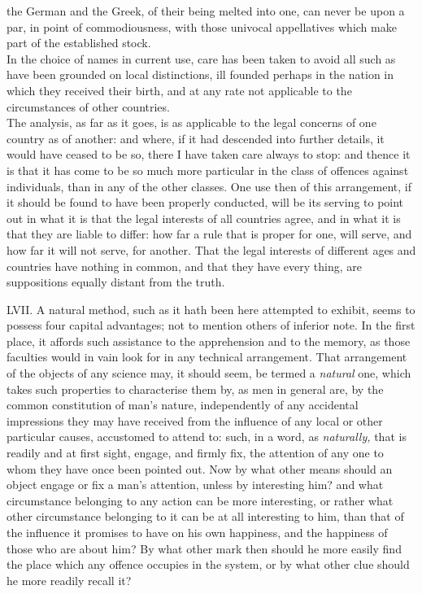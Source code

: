 \documentclass[12pt]{report}
\begin{document}
the German and the Greek, of their being melted into one, can never be
upon a par, in point of commodiousness, with those univocal appellatives
which make part of the established stock.\\
In the choice of names in current use, care has been taken to avoid all
such as have been grounded on local distinctions, ill founded perhaps in
the nation in which they received their birth, and at any rate not
applicable to the circumstances of other countries.\\
The analysis, as far as it goes, is as applicable to the legal concerns
of one country as of another: and where, if it had descended into
further details, it would have ceased to be so, there I have taken care
always to stop: and thence it is that it has come to be so much more
particular in the class of offences against individuals, than in any of
the other classes. One use then of this arrangement, if it should be
found to have been properly conducted, will be its serving to point out
in what it is that the legal interests of all countries agree, and in
what it is that they are liable to differ: how far a rule that is proper
for one, will serve, and how far it will not serve, for another. That
the legal interests of different ages and countries have nothing in
common, and that they have every thing, are suppositions equally distant
from the truth.

LVII. A natural method, such as it hath been here attempted to exhibit,
seems to possess four capital advantages; not to mention others of
inferior note. In the first place, it affords such assistance to the
apprehension and to the memory, as those faculties would in vain look
for in any technical arrangement. That arrangement of the objects of any
science may, it should seem, be termed a \emph{natural} one, which takes
such properties to characterise them by, as men in general are, by the
common constitution of man's nature, independently of any accidental
impressions they may have received from the influence of any local or
other particular causes, accustomed to attend to: such, in a word, as
\emph{naturally,} that is readily and at first sight, engage, and firmly
fix, the attention of any one to whom they have once been pointed out.
Now by what other means should an object engage or fix a man's
attention, unless by interesting him? and what circumstance belonging to
any action can be more interesting, or rather what other circumstance
belonging to it can be at all interesting to him, than that of the
influence it promises to have on his own happiness, and the happiness of
those who are about him? By what other mark then should he more easily
find the place which any offence occupies in the system, or by what
other clue should he more readily recall it?
\end{document}
